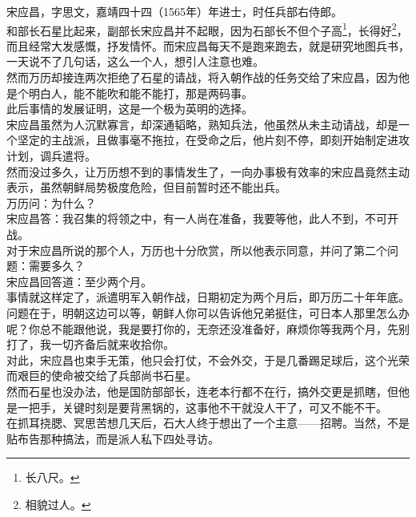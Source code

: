 \begin{multicols}{\theparacolNo}
宋应昌，字思文，嘉靖四十四（1565年）年进士，时任兵部右侍郎。\\

和部长石星比起来，副部长宋应昌并不起眼，因为石部长不但个子高\footnote{长八尺。}，长得好\footnote{相貌过人。}，而且经常大发感慨，抒发情怀。而宋应昌每天不是跑来跑去，就是研究地图兵书，一天说不了几句话，这么一个人，想引人注意也难。\\

然而万历却接连两次拒绝了石星的请战，将入朝作战的任务交给了宋应昌，因为他是个明白人，能不能吹和能不能打，那是两码事。\\

此后事情的发展证明，这是一个极为英明的选择。\\

宋应昌虽然为人沉默寡言，却深通韬略，熟知兵法，他虽然从未主动请战，却是一个坚定的主战派，且做事毫不拖拉，在受命之后，他片刻不停，即刻开始制定进攻计划，调兵遣将。\\

然而没过多久，让万历想不到的事情发生了，一向办事极有效率的宋应昌竟然主动表示，虽然朝鲜局势极度危险，但目前暂时还不能出兵。\\

万历问：为什么？\\

宋应昌答：我召集的将领之中，有一人尚在准备，我要等他，此人不到，不可开战。\\

对于宋应昌所说的那个人，万历也十分欣赏，所以他表示同意，并问了第二个问题：需要多久？\\

宋应昌回答道：至少两个月。\\

事情就这样定了，派遣明军入朝作战，日期初定为两个月后，即万历二十年年底。\\

问题在于，明朝这边可以等，朝鲜人你可以告诉他兄弟挺住，可日本人那里怎么办呢？你总不能跟他说，我是要打你的，无奈还没准备好，麻烦你等我两个月，先别打了，我一切齐备后就来收拾你。\\

对此，宋应昌也束手无策，他只会打仗，不会外交，于是几番踢足球后，这个光荣而艰巨的使命被交给了兵部尚书石星。\\

然而石星也没办法，他是国防部部长，连老本行都不在行，搞外交更是抓瞎，但他是一把手，关键时刻是要背黑锅的，这事他不干就没人干了，可又不能不干。\\

在抓耳挠腮、冥思苦想几天后，石大人终于想出了一个主意——招聘。当然，不是贴布告那种搞法，而是派人私下四处寻访。\\


\end{multicols}
